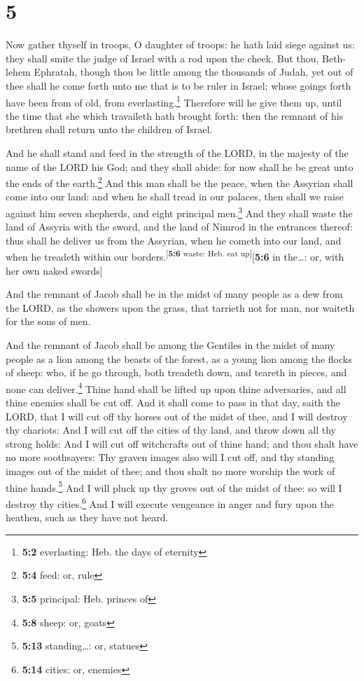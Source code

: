 \hypertarget{section-4}{%
\section{5}\label{section-4}}

 Now gather thyself in troops, O daughter of troops: he
hath laid siege against us: they shall smite the judge of Israel with a
rod upon the cheek.  But thou, Beth-lehem Ephratah, though
thou be little among the thousands of Judah, yet out of thee shall he
come forth unto me that is to be ruler in Israel; whose goings forth
have been from of old, from everlasting.\footnote{\textbf{5:2}
  everlasting: Heb. the days of eternity}  Therefore will
he give them up, until the time that she which travaileth hath brought
forth: then the remnant of his brethren shall return unto the children
of Israel.

 And he shall stand and feed in the strength of the LORD,
in the majesty of the name of the LORD his God; and they shall abide:
for now shall he be great unto the ends of the earth.\footnote{\textbf{5:4}
  feed: or, rule}  And this man shall be the peace, when
the Assyrian shall come into our land: and when he shall tread in our
palaces, then shall we raise against him seven shepherds, and eight
principal men.\footnote{\textbf{5:5} principal: Heb. princes of}
 And they shall waste the land of Assyria with the sword,
and the land of Nimrod in the entrances thereof: thus shall he deliver
us from the Assyrian, when he cometh into our land, and when he treadeth
within our borders.\textsuperscript{{[}\textbf{5:6} waste: Heb. eat
up{]}}{[}\textbf{5:6} in the\ldots: or, with her own naked swords{]}

 And the remnant of Jacob shall be in the midst of many
people as a dew from the LORD, as the showers upon the grass, that
tarrieth not for man, nor waiteth for the sons of men.

 And the remnant of Jacob shall be among the Gentiles in
the midst of many people as a lion among the beasts of the forest, as a
young lion among the flocks of sheep: who, if he go through, both
treadeth down, and teareth in pieces, and none can deliver.\footnote{\textbf{5:8}
  sheep: or, goats}  Thine hand shall be lifted up upon
thine adversaries, and all thine enemies shall be cut off.
 And it shall come to pass in that day, saith the LORD,
that I will cut off thy horses out of the midst of thee, and I will
destroy thy chariots:  And I will cut off the cities of
thy land, and throw down all thy strong holds:  And I
will cut off witchcrafts out of thine hand; and thou shalt have no more
soothsayers:  Thy graven images also will I cut off, and
thy standing images out of the midst of thee; and thou shalt no more
worship the work of thine hands.\footnote{\textbf{5:13} standing\ldots:
  or, statues}  And I will pluck up thy groves out of the
midst of thee: so will I destroy thy cities.\footnote{\textbf{5:14}
  cities: or, enemies}  And I will execute vengeance in
anger and fury upon the heathen, such as they have not heard.

